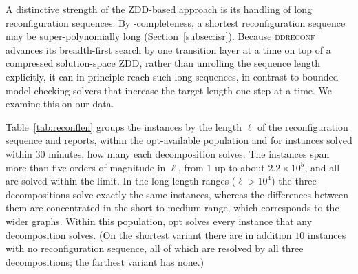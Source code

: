 \documentclass[conference]{IEEEtran}
\newcommand{\OptDecom}{\textsf{opt}\xspace}
\begin{document}

A distinctive strength of the ZDD-based approach is its handling of long
reconfiguration sequences.
By \PSPACE-completeness, a shortest reconfiguration sequence may be
super-polynomially long (Section~\ref{subsec:isr}).
Because \textsc{ddreconf} advances its breadth-first search by one transition
layer at a time on top of a compressed solution-space ZDD, rather than unrolling
the sequence length explicitly, it can in principle reach such long sequences,
in contrast to bounded-model-checking solvers that increase the target length
one step at a time.
We examine this on our data.

Table~\ref{tab:reconflen} groups the instances by the length $\ell$ of the
reconfiguration sequence and reports, within the opt-available population and for
instances solved within $30$ minutes, how many each decomposition solves.
The instances span more than five orders of magnitude in $\ell$, from $1$ up to
about $2.2\times10^{5}$, and all are solved within the limit.
In the long-length ranges ($\ell>10^{4}$) the three decompositions solve exactly the
same instances, whereas the differences between them are concentrated in the
short-to-medium range, which corresponds to the wider graphs.
Within this population, \OptDecom solves every instance that any decomposition solves.
(On the shortest variant there are in addition $10$ instances with no
reconfiguration sequence, all of which are resolved by all three decompositions; the
farthest variant has none.)
\end{document}
